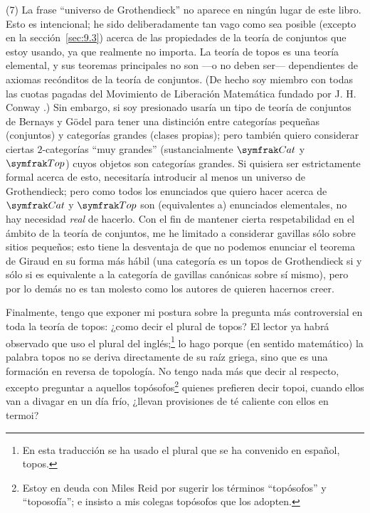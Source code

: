 (7) La frase \enquote{universo de Grothendieck} no aparece en ningún lugar de
este libro. Esto es intencional; he sido deliberadamente tan vago como sea
posible (excepto en la sección~\ref{sec:9.3}) acerca de las propiedades de la
teoría de conjuntos que estoy usando, ya que realmente no importa. La teoría de
topos es una teoría elemental, y sus teoremas principales no son ---o no deben
ser--- dependientes de axiomas recónditos de la teoría de conjuntos. (De hecho
soy miembro con todas las cuotas pagadas del Movimiento de Liberación Matemática
fundado por J. H. Conway \pend{[157]}.) Sin embargo, si soy presionado usaría un
tipo de teoría de conjuntos de Bernays y Gödel para tener una distinción entre
categorías pequeñas (conjuntos) y categorías grandes (clases propias); pero
también quiero considerar ciertas \(2\)-categorías \enquote{muy grandes}
(sustancialmente \(\catcat\) y \(\cattop\)) cuyos objetos son categorías
grandes. Si quisiera ser estrictamente formal acerca de esto, necesitaría
introducir al menos un universo de Grothendieck; pero como todos los enunciados
que quiero hacer acerca de \(\catcat\) y \(\cattop\) son (equivalentes a)
enunciados elementales, no hay necesidad \textit{real} de hacerlo. Con el fin de
mantener cierta respetabilidad en el ámbito de la teoría de conjuntos, me he
limitado a considerar gavillas sólo sobre sitios pequeños; esto tiene la
desventaja de que no podemos enunciar el teorema de Giraud en su forma más hábil
(una categoría es un topos de Grothendieck si y sólo si es equivalente a la
categoría de gavillas canónicas sobre sí mismo), pero por lo demás no es tan
molesto como los autores de \pend{[GV]} quieren hacernos creer.

Finalmente, tengo que exponer mi postura sobre la pregunta más controversial en
toda la teoría de topos: ¿como decir el plural de topos? El lector ya habrá
observado que uso el plural del inglés;\footnote{En esta traducción se ha usado
el plural que se ha convenido en español, topos.} lo hago porque (en sentido
matemático) la palabra topos no se deriva directamente de su raíz griega, sino
que es una formación en reversa de topología. No tengo nada más que decir al
respecto, excepto preguntar a aquellos topósofos\footnote{Estoy en deuda con
Miles Reid por sugerir los términos \enquote{topósofos} y \enquote{toposofía}; e
insisto a mis colegas topósofos que los adopten.} quienes prefieren decir topoi,
cuando ellos van a divagar en un día frío, ¿llevan provisiones de té caliente
con ellos en termoi?